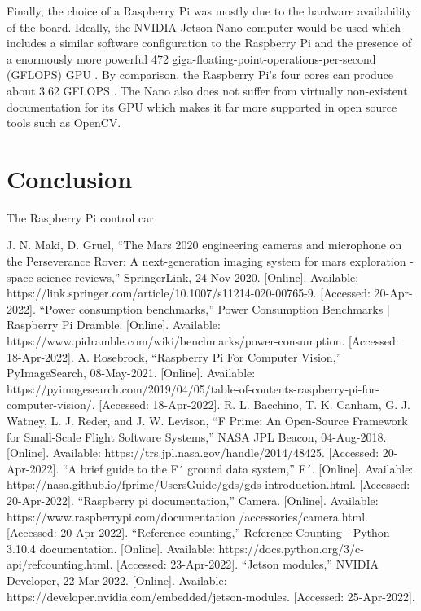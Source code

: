 \documentclass{article}
\begin{document}
Finally, the choice of a Raspberry Pi was mostly due to the hardware availability of the board. Ideally, the NVIDIA Jetson Nano computer would be used which includes a similar software configuration to the Raspberry Pi and the presence of a enormously more powerful 472 giga-floating-point-operations-per-second (GFLOPS) GPU \cite{b8}. By comparison, the Raspberry Pi's four cores can produce about 3.62 GFLOPS \cite{b2}. The Nano also does not suffer from virtually non-existent documentation for its GPU which makes it far more supported in open source tools such as OpenCV.

\section{Conclusion}

The Raspberry Pi control car 

\begin{thebibliography}{00}
 J. N. Maki, D. Gruel, “The Mars 2020 engineering cameras and microphone on the Perseverance Rover: A next-generation imaging system for mars exploration - space science reviews,” SpringerLink, 24-Nov-2020. [Online]. Available: https://link.springer.com/article/10.1007/s11214-020-00765-9. [Accessed: 20-Apr-2022]. 
 “Power consumption benchmarks,” Power Consumption Benchmarks | Raspberry Pi Dramble. [Online]. Available: https://www.pidramble.com/wiki/benchmarks/power-consumption. [Accessed: 18-Apr-2022].
 A. Rosebrock, “Raspberry Pi For Computer Vision,” PyImageSearch, 08-May-2021. [Online]. Available: https://pyimagesearch.com/2019/04/05/table-of-contents-raspberry-pi-for-computer-vision/. [Accessed: 18-Apr-2022].
 R. L. Bacchino, T. K. Canham, G. J. Watney, L. J. Reder, and J. W. Levison, “F Prime: An Open-Source Framework for Small-Scale Flight Software Systems,” NASA JPL Beacon, 04-Aug-2018. [Online]. Available: https://trs.jpl.nasa.gov/handle/2014/48425. [Accessed: 20-Apr-2022]. 
 “A brief guide to the F´ ground data system,” F´. [Online]. Available: https://nasa.github.io/fprime/UsersGuide/gds/gds-introduction.html. [Accessed: 20-Apr-2022].
 “Raspberry pi documentation,” Camera. [Online]. Available: https://www.raspberrypi.com/documentation
/accessories/camera.html. [Accessed: 20-Apr-2022].
 “Reference counting,” Reference Counting - Python 3.10.4 documentation. [Online]. Available: https://docs.python.org/3/c-api/refcounting.html. [Accessed: 23-Apr-2022].
 “Jetson modules,” NVIDIA Developer, 22-Mar-2022. [Online]. Available: https://developer.nvidia.com/embedded/jetson-modules. [Accessed: 25-Apr-2022]. 
\end{thebibliography}
\end{document}
